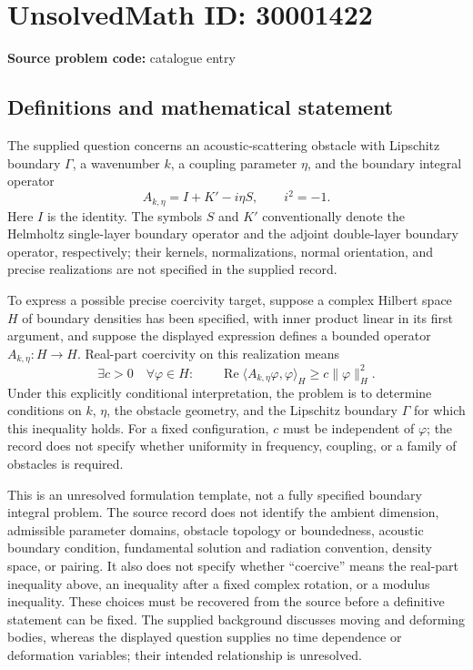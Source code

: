 \documentclass[11pt]{article}
\begin{document}
\section*{UnsolvedMath ID: 30001422}
\textbf{Source problem code:} catalogue entry
\subsection{Definitions and mathematical statement}
The supplied question concerns an acoustic-scattering obstacle with Lipschitz boundary \(\Gamma\), a wavenumber \(k\), a coupling parameter \(\eta\), and the boundary integral operator
\[
A_{k,\eta}=I+K'-i\eta S,
\qquad i^2=-1.
\]
Here \(I\) is the identity. The symbols \(S\) and \(K'\) conventionally denote the Helmholtz single-layer boundary operator and the adjoint double-layer boundary operator, respectively; their kernels, normalizations, normal orientation, and precise realizations are not specified in the supplied record.

To express a possible precise coercivity target, suppose a complex Hilbert space \(H\) of boundary densities has been specified, with inner product linear in its first argument, and suppose the displayed expression defines a bounded operator \(A_{k,\eta}:H\to H\). Real-part coercivity on this realization means
\[
\exists c>0\quad\forall\varphi\in H:\qquad
\operatorname{Re}\langle A_{k,\eta}\varphi,\varphi\rangle_H
\ge c\|\varphi\|_H^2.
\]
Under this explicitly conditional interpretation, the problem is to determine conditions on \(k\), \(\eta\), the obstacle geometry, and the Lipschitz boundary \(\Gamma\) for which this inequality holds. For a fixed configuration, \(c\) must be independent of \(\varphi\); the record does not specify whether uniformity in frequency, coupling, or a family of obstacles is required.

This is an unresolved formulation template, not a fully specified boundary integral problem. The source record does not identify the ambient dimension, admissible parameter domains, obstacle topology or boundedness, acoustic boundary condition, fundamental solution and radiation convention, density space, or pairing. It also does not specify whether ``coercive'' means the real-part inequality above, an inequality after a fixed complex rotation, or a modulus inequality. These choices must be recovered from the source before a definitive statement can be fixed. The supplied background discusses moving and deforming bodies, whereas the displayed question supplies no time dependence or deformation variables; their intended relationship is unresolved.
\end{document}
